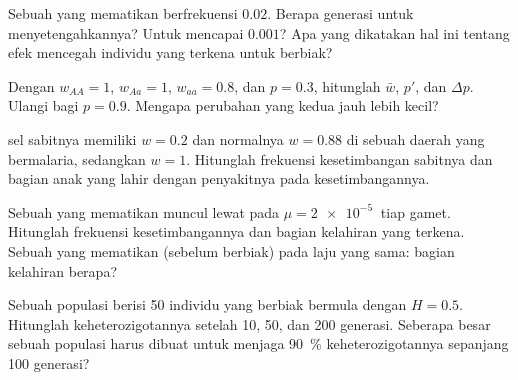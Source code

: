 \begin{exercise}[$\star\star$]\label{exo:b2:population-genetics:5}
Sebuah   yang mematikan berfrekuensi $0.02$. Berapa generasi
untuk menyetengahkannya? Untuk mencapai $0.001$? Apa yang dikatakan hal
ini tentang efek mencegah individu yang terkena untuk berbiak?
\end{exercise}

\begin{exercise}[$\star\star$]\label{exo:b2:population-genetics:6}
Dengan $w_{AA} = 1$, $w_{Aa} = 1$, $w_{aa} = 0.8$, dan $p = 0.3$,
hitunglah $\bar w$, $p'$, dan $\Delta p$. Ulangi bagi $p = 0.9$.
Mengapa perubahan yang kedua jauh lebih kecil?
\end{exercise}

\begin{exercise}[$\star\star$]\label{exo:b2:population-genetics:7}
 sel sabitnya memiliki $w = 0.2$ dan  normalnya $w = 0.88$ di sebuah daerah yang bermalaria, sedangkan  $w = 1$. Hitunglah frekuensi kesetimbangan  sabitnya dan bagian anak
yang lahir dengan penyakitnya pada kesetimbangannya.
\end{exercise}

\begin{exercise}[$\star\star$]\label{exo:b2:population-genetics:8}
Sebuah   yang mematikan muncul lewat  pada $\mu = \qty{2e-5}{}$ tiap gamet. Hitunglah frekuensi kesetimbangannya dan
bagian kelahiran yang terkena. Sebuah   yang mematikan
(sebelum berbiak) pada laju yang sama: bagian kelahiran berapa?
\end{exercise}

\begin{exercise}[$\star\star$]\label{exo:b2:population-genetics:9}
Sebuah populasi berisi 50 individu yang berbiak bermula dengan $H = 0.5$. Hitunglah keheterozigotannya setelah 10, 50, dan 200 generasi.
Seberapa besar sebuah populasi harus dibuat untuk menjaga \qty{90}{\%}
keheterozigotannya sepanjang 100 generasi?
\end{exercise}


